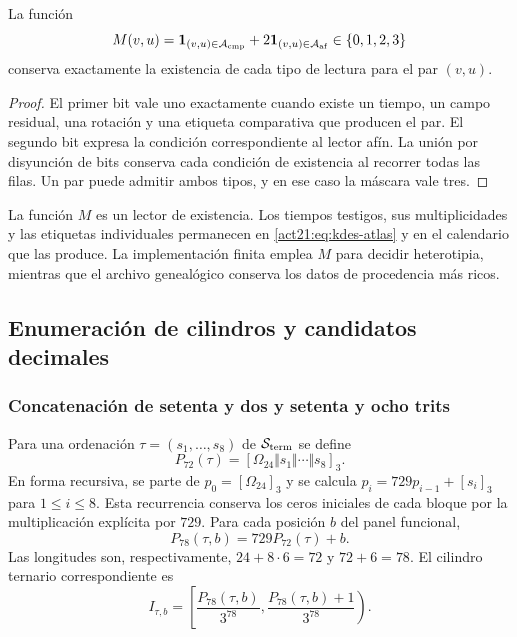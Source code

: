 \begin{proposition}
La función
\[
 M(v,u)=\mathbf1_{(v,u)\in\mathcal A_{\rm cmp}}
        +2\mathbf1_{(v,u)\in\mathcal A_{\rm af}}
        \in\{0,1,2,3\}
\]
conserva exactamente la existencia de cada tipo de lectura para el par
$(v,u)$.
\end{proposition}
\begin{proof}
El primer bit vale uno exactamente cuando existe un tiempo, un campo
residual, una rotación y una etiqueta comparativa que producen el par.
El segundo bit expresa la condición correspondiente al lector afín.
La unión por disyunción de bits conserva cada condición de existencia
al recorrer todas las filas. Un par puede admitir ambos tipos, y en ese
caso la máscara vale tres.
\end{proof}

La función $M$ es un lector de existencia. Los tiempos testigos, sus
multiplicidades y las etiquetas individuales permanecen en
\eqref{act21:eq:kdes-atlas} y en el calendario que las produce. La
implementación finita emplea $M$ para decidir heterotipia, mientras que
el archivo genealógico conserva los datos de procedencia más ricos.

\subsection{Enumeración de cilindros y candidatos decimales}

\subsubsection{Concatenación de setenta y dos y setenta y ocho trits}

Para una ordenación $\tau=(s_1,\ldots,s_8)$ de
$\mathcal S_{\rm term}$ se define
\[
 P_{72}(\tau)=[\Omega_{24}\Vert s_1\Vert\cdots\Vert s_8]_3.
\]
En forma recursiva, se parte de $p_0=[\Omega_{24}]_3$ y se calcula
$p_i=729p_{i-1}+[s_i]_3$ para $1\leq i\leq8$. Esta recurrencia
conserva los ceros iniciales de cada bloque por la multiplicación
explícita por $729$. Para cada posición $b$ del panel funcional,
\[
 P_{78}(\tau,b)=729P_{72}(\tau)+b.
\]
Las longitudes son, respectivamente, $24+8\cdot6=72$ y $72+6=78$.
El cilindro ternario correspondiente es
\begin{equation}
 I_{\tau,b}=
 \left[\frac{P_{78}(\tau,b)}{3^{78}},
       \frac{P_{78}(\tau,b)+1}{3^{78}}\right).
 \label{act21:eq:kdes-cilindro}
\end{equation}

